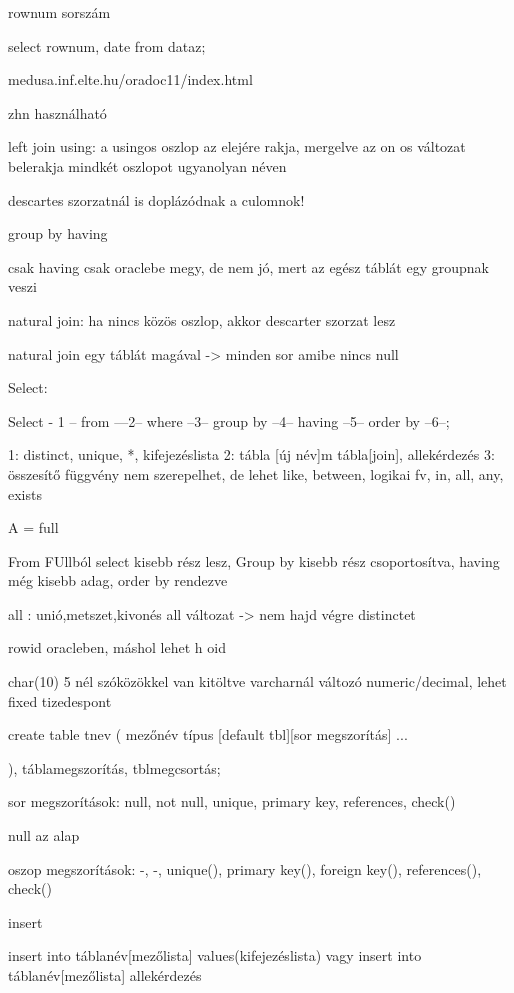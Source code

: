

rownum  sorszám

select rownum, date from dataz;

medusa.inf.elte.hu/oradoc11/index.html

zhn használható


left join using:
a usingos oszlop az elejére rakja, mergelve
az on os változat belerakja mindkét oszlopot ugyanolyan néven

descartes szorzatnál is doplázódnak a culomnok!
 
group by  having

csak having csak oraclebe megy, de nem jó, mert az egész táblát egy groupnak veszi

natural join: ha nincs közös oszlop, akkor descarter szorzat lesz

natural join egy táblát magával -> minden sor amibe nincs null



Select:

Select - 1 -- from ---2-- where --3-- group by --4-- having --5-- order by --6--;

1: distinct, unique, *, kifejezéslista
2: tábla [új név]m tábla[join], allekérdezés
3: összesítő függvény nem szerepelhet, de lehet like, between, logikai fv, in, all, any, exists


A = full

From FUllból select kisebb rész lesz, Group by kisebb rész csoportosítva, having még kisebb adag, order by rendezve

all : unió,metszet,kivonés all változat -> nem hajd végre distinctet


rowid oracleben, máshol lehet h oid

char(10) 5 nél szóközökkel van kitöltve
varcharnál változó
numeric/decimal, lehet fixed tizedespont


create table tnev (
    mezőnév típus [default tbl][sor megszorítás]
    ...

), táblamegszorítás, tblmegcsortás;



sor megszorítások:
null, not null, unique, primary key, references, check()

null az alap

oszop megszorítások:
-, -, unique(), primary key(), foreign key(), references(), check()

insert

insert into táblanév[mezőlista] values(kifejezéslista)
vagy
insert into táblanév[mezőlista] allekérdezés
